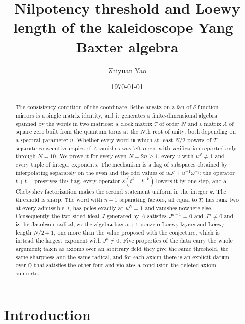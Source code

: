 \documentclass[11pt,reqno]{amsart}
\title[Nilpotency and Loewy length of the kaleidoscope algebra]
{Nilpotency threshold and Loewy length of the kaleidoscope
Yang--Baxter algebra}
\author{Zhiyuan Yao}
\date{\today}
\theoremstyle{plain}
\theoremstyle{definition}
\theoremstyle{remark}
\numberwithin{equation}{section}
\begin{document}
\begin{abstract}
The consistency condition of the coordinate Bethe ansatz on a fan of
$\delta$-function mirrors is a single matrix identity, and it generates a
finite-dimensional algebra spanned by the words in two matrices: a clock
matrix $T$ of order $N$ and a matrix $\Lambda$ of square zero built from the
quantum torus at the $N$th root of unity, both depending on a spectral
parameter $u$. Whether every word in which at least $N/2$ powers of $T$
separate consecutive copies of $\Lambda$ vanishes was left open, with
verification reported only through $N=10$. We prove it for every even
$N=2n\ge4$, every $u$ with $u^N\ne1$ and every tuple of integer exponents. The
mechanism is a flag of subspaces obtained by interpolating separately on the
even and the odd values of $u\omega^{j}+u^{-1}\omega^{-j}$: the operator
$t+t^{-1}$ preserves this flag, every operator $s(t^{k}-t^{-k})$ lowers it by
one step, and a Chebyshev factorization makes the second statement uniform in
the integer $k$. The threshold is sharp. The word with $n-1$ separating
factors, all equal to $T$, has rank two at every admissible $u$, has poles
exactly at $u^{N}=1$ and vanishes nowhere else. Consequently the two-sided
ideal $J$ generated by $\Lambda$ satisfies $J^{n+1}=0$ and $J^{n}\ne0$ and is
the Jacobson radical, so the algebra has $n+1$ nonzero Loewy layers and Loewy
length $N/2+1$, one more than the value proposed with the conjecture, which is
instead the largest exponent with $J^{n}\ne0$. Five properties of the data
carry the whole argument; taken as axioms over an arbitrary field they give
the same threshold, the same sharpness and the same radical, and for each
axiom there is an explicit datum over $\mathbb{Q}$ that satisfies the other
four and violates a conclusion the deleted axiom supports.
\end{abstract}

\maketitle

\section{Introduction}
\label{sec:intro}
\end{document}
